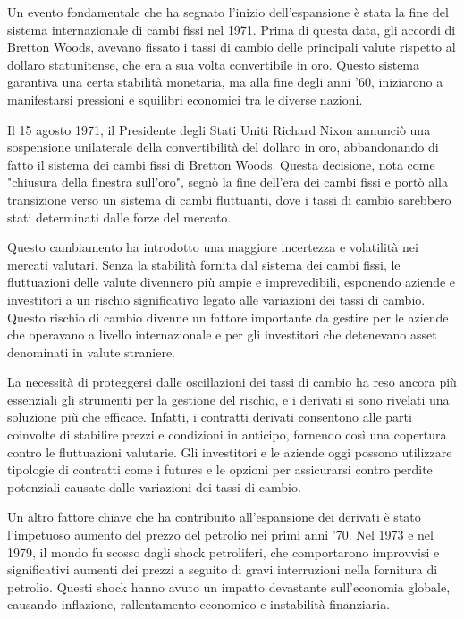 \documentclass[12pt,a4paper]{report}
\begin{document}
Un evento fondamentale che ha segnato l'inizio dell'espansione è stata la fine del sistema internazionale di cambi fissi nel 1971. Prima di questa data, gli accordi di Bretton Woods, avevano fissato i tassi di cambio delle principali valute rispetto al dollaro statunitense, che era a sua volta convertibile in oro. Questo sistema garantiva una certa stabilità monetaria, ma alla fine degli anni '60, iniziarono a manifestarsi pressioni e squilibri economici tra le diverse nazioni.

Il 15 agosto 1971, il Presidente degli Stati Uniti Richard Nixon annunciò una sospensione unilaterale della convertibilità del dollaro in oro, abbandonando di fatto il sistema dei cambi fissi di Bretton Woods. Questa decisione, nota come "chiusura della finestra sull'oro", segnò la fine dell'era dei cambi fissi e portò alla transizione verso un sistema di cambi fluttuanti, dove i tassi di cambio sarebbero stati determinati dalle forze del mercato.

Questo cambiamento ha introdotto una maggiore incertezza e volatilità nei mercati valutari. Senza la stabilità fornita dal sistema dei cambi fissi, le fluttuazioni delle valute divennero più ampie e imprevedibili, esponendo aziende e investitori a un rischio significativo legato alle variazioni dei tassi di cambio. Questo rischio di cambio divenne un fattore importante da gestire per le aziende che operavano a livello internazionale e per gli investitori che detenevano asset denominati in valute straniere.

La necessità di proteggersi dalle oscillazioni dei tassi di cambio ha reso ancora più essenziali gli strumenti per la gestione del rischio, e i derivati si sono rivelati una soluzione più che efficace. Infatti, i contratti derivati consentono alle parti coinvolte di stabilire prezzi e condizioni in anticipo, fornendo così una copertura contro le fluttuazioni valutarie. Gli investitori e le aziende oggi possono utilizzare tipologie di contratti come i futures e le opzioni per assicurarsi contro perdite potenziali causate dalle variazioni dei tassi di cambio.

Un altro fattore chiave che ha contribuito all'espansione dei derivati è stato l'impetuoso aumento del prezzo del petrolio nei primi anni '70. Nel 1973 e nel 1979, il mondo fu scosso dagli shock petroliferi, che comportarono improvvisi e significativi aumenti dei prezzi a seguito di gravi interruzioni nella fornitura di petrolio. Questi shock hanno avuto un impatto devastante sull'economia globale, causando inflazione, rallentamento economico e instabilità finanziaria.
\end{document}
